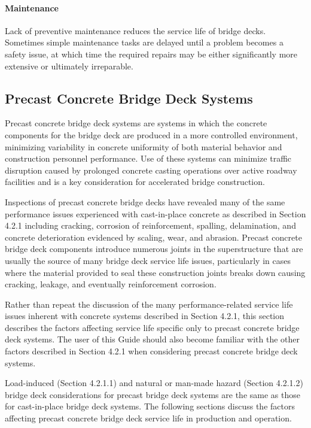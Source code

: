 \paragraph{Maintenance}
Lack of preventive maintenance reduces the service life of bridge decks. Sometimes simple maintenance tasks
are delayed until a problem becomes a safety issue, at which time the required repairs may be either significantly
more extensive or ultimately irreparable.


\subsection{Precast Concrete Bridge Deck Systems}
Precast concrete bridge deck systems are systems in which the concrete components for the bridge deck are
produced in a more controlled environment, minimizing variability in concrete uniformity of both material behavior
and construction personnel performance. Use of these systems can minimize traffic disruption caused by prolonged
concrete casting operations over active roadway facilities and is a key consideration for accelerated bridge
construction.

Inspections of precast concrete bridge decks have revealed many of the same performance issues experienced
with cast-in-place concrete as described in Section 4.2.1 including cracking, corrosion of reinforcement, spalling,
delamination, and concrete deterioration evidenced by scaling, wear, and abrasion. Precast concrete bridge deck
components introduce numerous joints in the superstructure that are usually the source of many bridge deck service
life issues, particularly in cases where the material provided to seal these construction joints breaks down causing
cracking, leakage, and eventually reinforcement corrosion.

Rather than repeat the discussion of the many performance-related service life issues inherent with concrete
systems described in Section 4.2.1, this section describes the factors affecting service life specific only to precast
concrete bridge deck systems. The user of this Guide should also become familiar with the other factors described in
Section 4.2.1 when considering precast concrete bridge deck systems.

Load-induced (Section 4.2.1.1) and natural or man-made hazard (Section 4.2.1.2) bridge deck considerations for
precast bridge deck systems are the same as those for cast-in-place bridge deck systems. The following sections
discuss the factors affecting precast concrete bridge deck service life in production and operation.

